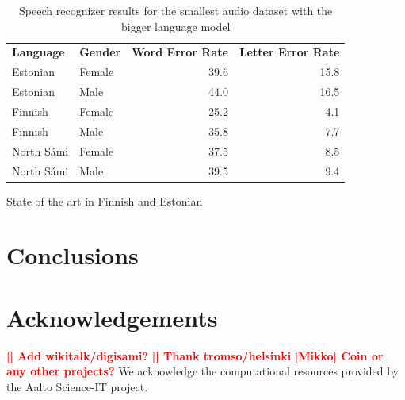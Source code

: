 \documentclass[b5paper]{article}
\newcommand{\todo}[2]{{\textcolor{red}{\bf [#1] #2 }}}
\newcommand{\ns}{{North Sámi }}
\begin{document}
\begin{table}[h!]

\centering
\begin{tabular}{llrr}
\textbf{Language} & \textbf{Gender} & \textbf{Word Error Rate} & \textbf{Letter Error Rate}\\
Estonian & Female & 39.6 & 15.8 \\
Estonian & Male & 44.0 & 16.5\\
Finnish & Female & 25.2 &4.1 \\
Finnish & Male &  35.8 & 7.7 \\
\ns & Female & 37.5 & 8.5 \\
\ns & Male & 39.5 & 9.4 \\
\end{tabular}
\caption{Speech recognizer results for the smallest audio dataset with the bigger language model \label{tbl:resultssmallcomp}}
\end{table}



State of the art in Finnish \cite{hirsimaki2006unlimited} and Estonian \cite{kurimo2015modeling}
\section{Conclusions} 

\section{Acknowledgements} 
\todo{}{Add wikitalk/digisami?} \todo{}{Thank tromso/helsinki} \todo{Mikko}{Coin or any other projects?}
We acknowledge the computational resources provided by the Aalto Science-IT project.




 
\end{document}
